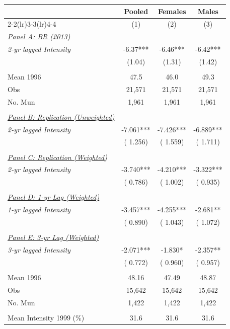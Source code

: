\begin{tabular}{lccc} \hline \hline
& \multicolumn{1}{c}{Pooled} & \multicolumn{1}{c}{Females} & \multicolumn{1}{c}{Males} \\ 
\cmidrule(lr){2-2}\cmidrule(lr){3-3}\cmidrule(lr){4-4}  
& \multicolumn{1}{c}{(1)} & \multicolumn{1}{c}{(2)} & \multicolumn{1}{c}{(3)} \\ \toprule 
\underline{\textit{Panel A: BR (2013)}}  \\ 
\textit{2-yr lagged Intensity} & -6.37*** & -6.46*** & -6.42*** \\ 
 & (1.04) & (1.31) & (1.42) \\ 
  & & & \\ 
Mean 1996 & 47.5 & 46.0 & 49.3 \\ 
Obs & 21,571 & 21,571 & 21,571 \\ 
No. Mun & 1,961 & 1,961 & 1,961 \\ 
  & & & \\ 
\underline{\textit{Panel B: Replication (Unweighted)}}  \\ 
\textit{2-yr lagged Intensity} &       -7.061*** &       -7.426*** &       -6.889*** \\ 
 & (       1.256) & (       1.559) & (       1.711) \\ 
  & & & \\ 
\underline{\textit{Panel C: Replication (Weighted)}}  \\ 
\textit{2-yr lagged Intensity} &       -3.740*** &       -4.210*** &       -3.322*** \\ 
 & (       0.786) & (       1.002) & (       0.935) \\ 
  & & & \\ 
\underline{\textit{Panel D: 1-yr Lag (Weighted)}}  \\ 
\textit{1-yr lagged Intensity} &       -3.457*** &       -4.255*** &       -2.681** \\ 
 & (       0.890) & (       1.043) & (       1.072) \\ 
  & & & \\ 
\underline{\textit{Panel E: 3-yr Lag (Weighted)}}  \\ 
\textit{3-yr lagged Intensity} &       -2.071*** &       -1.830* &       -2.357** \\ 
 & (       0.772) & (       0.960) & (       0.957) \\ 
  & & & \\ 
Mean 1996 &        48.16 &        47.49 &        48.87 \\ 
Obs &       15,642 &       15,642 &       15,642 \\ 
No. Mun &        1,422 &        1,422 &        1,422 \\ 
  & & & \\ 
Mean Intensity 1999 (\%) &   31.6 &   31.6 &   31.6 \\ 
\bottomrule
\end{tabular}